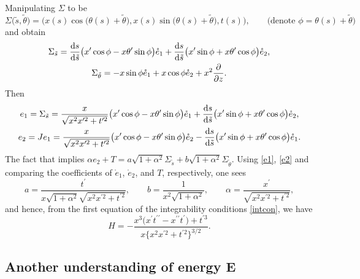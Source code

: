 \documentclass[pdftex]{sigma}
\numberwithin{equation}{section}
\begin{document}
Manipulating $\Sigma$ to be
\begin{equation*} \label{surface2}
\Sigma\bigl(\tilde s,\tilde \theta\bigr)=\bigl(x(s)\cos \bigl(\theta(s)+\tilde \theta\bigr),
x(s)\sin\bigl( \theta(s)+\tilde \theta\bigr), t(s)\bigr),\qquad \bigl(\mbox{denote }
\phi=\theta(s)+\tilde \theta\bigr)
\end{equation*}
and obtain
\begin{gather*}
\Sigma_{\tilde s}=\frac{{\rm d} s}{{\rm d} \tilde s}\bigl(x^{\prime }\cos
\phi-x\theta^{\prime }\sin \phi\bigr)\mathring e_1+\frac{{\rm d}s}{{\rm d} \tilde s}
\bigl(x^{\prime }\sin \phi+x\theta^{\prime }\cos \phi\bigr)\mathring e_2, \\
\Sigma_{\tilde \theta}=-x\sin \phi \mathring e_1+x\cos \phi \mathring
e_2+x^2\frac{\partial}{\partial z}.
\end{gather*}
Then
\begin{gather}
e_1=\Sigma_{\tilde s}=\frac{x}{\sqrt{x^2x^{\prime 2}+t^{\prime 2}}}
\bigl(x^{\prime }\cos \phi-x\theta^{\prime }\sin \phi\bigr)\mathring e_1+\frac{{\rm d}s}{{\rm d}
\tilde s}\bigl(x^{\prime }\sin \phi+x\theta^{\prime }\cos \phi\bigr)\mathring e_2, \label{e1} \\
e_2=Je_1=\frac{x}{\sqrt{x^2x^{\prime 2}+t^{\prime 2}}}\bigl(x^{\prime }\cos
\phi-x\theta^{\prime }\sin \phi\bigr)\mathring e_2-\frac{{\rm d}s}{{\rm d} \tilde s}
\bigl(x^{\prime }\sin \phi+x\theta^{\prime }\cos \phi\bigr)\mathring e_1. \label{e2}
\end{gather}
The fact that  implies
$
\alpha e_2+T=a\sqrt{1+\alpha^2}\Sigma_{\tilde s}+b\sqrt{1+\alpha^2}
\Sigma_{\tilde \theta}$.
Using \eqref{e1}, \eqref{e2} and comparing the coefficients of $\mathring
e_1$, $\mathring e_2$, and $T$, respectively, one sees
\begin{equation} \label{a7}
a=\frac{t^{\prime }}{x\sqrt{1+\alpha^2}\sqrt{x^2x^{\prime 2}+t^{\prime 2}}}
,\qquad b=\frac{1}{x^2\sqrt{1+\alpha^2}},\qquad \alpha=\frac{x^{\prime }}{
\sqrt{x^2x^{\prime 2}+t^{\prime 2}}},
\end{equation}
and hence, from the first equation of the integrability conditions \eqref{intcon}, we have
\begin{equation} \label{a8}
H=-\frac{x^{3}\bigl(x^{\prime }t^{\prime \prime }-x^{\prime \prime
}t^{\prime }\bigr)+t^{\prime 3}}{x\big\{x^2x^{\prime 2}+t^{\prime 2}\big\}^{3/2}}.
\end{equation}

\subsection[Another understanding of energy E]{Another understanding of energy $\boldsymbol{ E}$}
\end{document}
